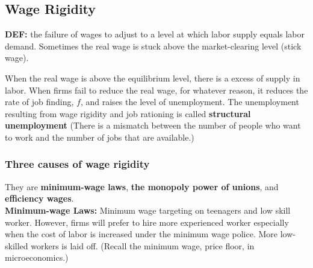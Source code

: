 \documentclass[12pt]{article}
\begin{document}
\subsection{Wage Rigidity}
{\textbf {DEF:}} the failure of wages to adjust to a level at which labor supply 
equals labor demand. Sometimes the real wage is stuck above the market-clearing level
(stick wage).


\begin{figure}[H]
\end{figure}


When the real wage is above the equilibrium level, there is a excess of supply in 
labor. When firms fail to reduce the real wage, for whatever reason, it reduces the 
rate of job finding, $ f $, and raises the level of unemployment. 
The unemployment resulting from wage rigidity and job rationing is called
{\textbf {structural unemployment}} (There is a mismatch between the number of people
who want to work and the number of jobs that are available.)


\subsubsection{Three causes of wage rigidity}
They are {\textbf {minimum-wage laws}}, {\textbf {the monopoly power of unions}}, and
{\textbf {efficiency wages}}.\\


{\textbf {Minimum-wage Laws:}}
Minimum wage targeting on teenagers and low skill worker. However, firms will prefer
to hire more experienced worker especially when the cost of labor is increased under
the minimum wage police. More low-skilled workers is laid off. (Recall the minimum
wage, price floor, in microeconomics.)\\
\end{document}
